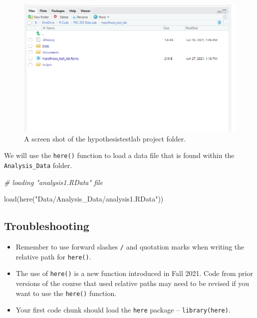 \documentclass[
]{book}
\newenvironment{Shaded}{\begin{snugshade}}{\end{snugshade}}
\newcommand{\CommentTok}[1]{\textcolor[rgb]{0.56,0.35,0.01}{\textit{#1}}}
\newcommand{\FunctionTok}[1]{\textcolor[rgb]{0.00,0.00,0.00}{#1}}
\newcommand{\NormalTok}[1]{#1}
\newcommand{\StringTok}[1]{\textcolor[rgb]{0.31,0.60,0.02}{#1}}
\providecommand{\tightlist}{%
  \setlength{\itemsep}{0pt}\setlength{\parskip}{0pt}}
\begin{document}
\begin{figure}
\includegraphics[width=11.89in]{images/here_example1} \caption{A screen shot of the hypothesistestlab project folder.}\label{fig:here-example}
\end{figure}

We will use the \texttt{here()} function to load a data file that is found within the \texttt{Analysis\_Data} folder.

\begin{Shaded}
\begin{Highlighting}[]
\CommentTok{\# loading "analysis1.RData" file}

\FunctionTok{load}\NormalTok{(}\FunctionTok{here}\NormalTok{(}\StringTok{"Data/Analysis\_Data/analysis1.RData"}\NormalTok{))}
\end{Highlighting}
\end{Shaded}

\hypertarget{troubleshooting-6}{%
\subsection{Troubleshooting}\label{troubleshooting-6}}

\begin{itemize}
\tightlist
\item
  Remember to use forward slashes \texttt{/} and quotation marks when writing the relative path for \texttt{here()}.
\item
  The use of \texttt{here()} is a new function introduced in Fall 2021. Code from prior versions of the course that used relative paths may need to be revised if you want to use the \texttt{here()} function.
\item
  Your first code chunk should load the \texttt{here} package -- \texttt{library(here)}.
\end{itemize}
\end{document}
